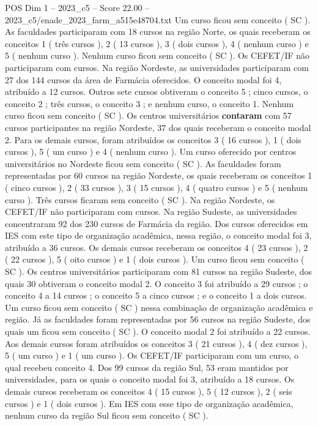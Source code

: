 \begin{textsample}{POS Dim 1 – 2023\_c5 – Score 22.00 – 2023\_c5/enade\_2023\_farm\_a515e48704.txt}
Um curso ficou sem conceito ( SC ).
As faculdades participaram com 18 cursos na região Norte, os quais receberam os conceitos 1 ( três cursos ), 2 ( 13 cursos ), 3 ( dois cursos ), 4 ( nenhum curso ) e 5 ( nenhum curso ).
Nenhum curso ficou sem conceito ( SC ).
Os CEFET/IF não participaram com cursos.
Na região Nordeste, as universidades participaram com 27 dos 144 cursos da área de Farmácia oferecidos.
O conceito modal foi 4, atribuído a 12 cursos.
Outros sete cursos obtiveram o conceito 5 ; cinco cursos, o conceito 2 ; três cursos, o conceito 3 ; e nenhum curso, o conceito 1.
Nenhum curso ficou sem conceito ( SC ).
Os centros universitários \textbf{contaram} com 57 cursos participantes na região Nordeste, 37 dos quais receberam o conceito modal 2.
Para os demais cursos, foram atribuídos os conceitos 3 ( 16 cursos ), 1 ( dois cursos ), 5 ( um curso ) e 4 ( nenhum curso ).
Um curso oferecido por centros universitários no Nordeste ficou sem conceito ( SC ).
As faculdades foram representadas por 60 cursos na região Nordeste, os quais receberam os conceitos 1 ( cinco cursos ), 2 ( 33 cursos ), 3 ( 15 cursos ), 4 ( quatro cursos ) e 5 ( nenhum curso ).
Três cursos ficaram sem conceito ( SC ).
Na região Nordeste, os CEFET/IF não participaram com cursos.
Na região Sudeste, as universidades concentraram 92 dos 230 cursos de Farmácia da região.
Dos cursos oferecidos em IES com este tipo de organização acadêmica, nessa região, o conceito modal foi 3, atribuído a 36 cursos.
Os demais cursos receberam os conceitos 4 ( 23 cursos ), 2 ( 22 cursos ), 5 ( oito cursos ) e 1 ( dois cursos ).
Um curso ficou sem conceito ( SC ).
Os centros universitários participaram com 81 cursos na região Sudeste, dos quais 30 obtiveram o conceito modal 2.
O conceito 3 foi atribuído a 29 cursos ; o conceito 4 a 14 cursos ; o conceito 5 a cinco cursos ; e o conceito 1 a dois cursos.
Um curso ficou sem conceito ( SC ) nessa combinação de organização acadêmica e região.
Já as faculdades foram representadas por 56 cursos na região Sudeste, dos quais um ficou sem conceito ( SC ).
O conceito modal 2 foi atribuído a 22 cursos.
Aos demais cursos foram atribuídos os conceitos 3 ( 21 cursos ), 4 ( dez cursos ), 5 ( um curso ) e 1 ( um curso ).
Os CEFET/IF participaram com um curso, o qual recebeu conceito 4.
Dos 99 cursos da região Sul, 53 eram mantidos por universidades, para os quais o conceito modal foi 3, atribuído a 18 cursos.
Os demais cursos receberam os conceitos 4 ( 15 cursos ), 5 ( 12 cursos ), 2 ( seis cursos ) e 1 ( dois cursos ).
Em IES com esse tipo de organização acadêmica, nenhum curso da região Sul ficou sem conceito ( SC ).

\end{textsample}
